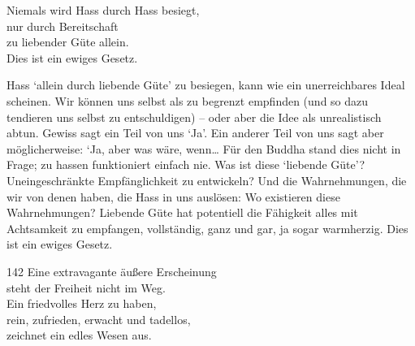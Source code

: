 
\begin{dhpVerse}{5}
\label{dhp-5}
Niemals wird Hass durch Hass besiegt,\\ 
nur durch Bereitschaft\\ 
zu liebender Güte allein.\\ 
Dies ist ein ewiges Gesetz. 
\end{dhpVerse}

\begin{dhpRefl}

Hass `allein durch liebende Güte' zu besiegen, kann wie ein unerreichbares
Ideal scheinen. Wir können uns selbst als zu begrenzt empfinden (und so dazu
tendieren uns selbst zu entschuldigen) -- oder aber die Idee als unrealistisch
abtun. Gewiss sagt ein Teil von uns `Ja'. Ein anderer Teil von uns sagt aber
möglicherweise: `Ja, aber was wäre, wenn… Für den Buddha stand dies nicht in
Frage; zu hassen funktioniert einfach nie. Was ist diese `liebende Güte'?
Uneingeschränkte Empfänglichkeit zu entwickeln? Und die Wahrnehmungen, die wir
von denen haben, die Hass in uns auslösen: Wo existieren diese Wahrnehmungen?
Liebende Güte hat potentiell die Fähigkeit alles mit Achtsamkeit zu empfangen,
vollständig, ganz und gar, ja sogar warmherzig. Dies ist ein ewiges Gesetz.

\end{dhpRefl}


\begin{dhpVerse}{142}
\label{dhp-142}
Eine extravagante äußere Erscheinung\\ 
steht der Freiheit nicht im Weg.\\ 
Ein friedvolles Herz zu haben,\\ 
rein, zufrieden, erwacht und tadellos,\\ 
zeichnet ein edles Wesen aus. 
\end{dhpVerse}

